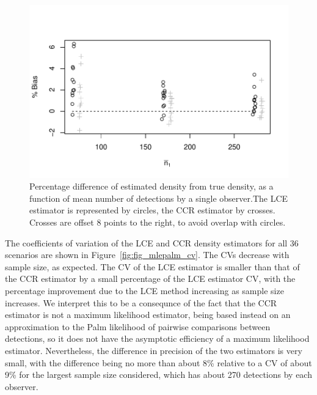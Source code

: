 \documentclass[useAMS, usenatbib, referee]{biom}\usepackage[]{graphicx}\usepackage[]{color}
\makeatletter
\def\maxwidth{ %
  \ifdim\Gin@nat@width>\linewidth
    \linewidth
  \else
    \Gin@nat@width
  \fi
}
\newenvironment{knitrout}{}{} %
\makeatother
\begin{document}
\begin{knitrout}
\color{fgcolor}\begin{figure}

{\centering \includegraphics[width=\maxwidth]{figs/fig_mlepalm_bias-1} 

}

\caption[Percentage difference of estimated density from true density, as a function of mean number of detections by a single observer.The LCE estimator is represented by circles, the CCR estimator by crosses]{Percentage difference of estimated density from true density, as a function of mean number of detections by a single observer.The LCE estimator is represented by circles, the CCR estimator by crosses. Crosses are offset 8 points to the right, to avoid overlap with circles.}\label{fig:fig_mlepalm_bias}
\end{figure}


\end{knitrout}

The coefficients of variation of the LCE and CCR density estimators for all 36 scenarios are shown in Figure~\ref{fig:fig_mlepalm_cv}. The CVs decrease with sample size, as expected. The CV of the LCE estimator is smaller than that of the CCR estimator by a small percentage of the LCE estimator CV, with the percentage improvement due to the LCE method increasing as sample size increases. We interpret this to be a consequnce of the fact that the CCR estimator is not a maximum likelihood estimator, being based instead on an approximation to the Palm likelihood of pairwise comparisons between detections, so it does not have the asymptotic efficiency of a maximum likelihood estimator. Nevertheless, the difference in precision of the two estimators is very small, with the difference being no more than about 8\% relative to a CV of about 9\% for the largest sample size considered, which has about 270 detections by each observer.
\end{document}
